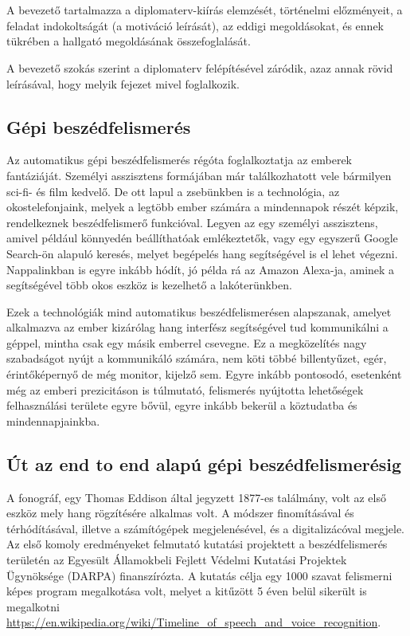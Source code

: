 \chapter{\bevezetes}

A bevezető tartalmazza a diplomaterv-kiírás elemzését, történelmi előzményeit, a feladat indokoltságát (a motiváció leírását), az eddigi megoldásokat, és ennek tükrében a hallgató megoldásának összefoglalását.

A bevezető szokás szerint a diplomaterv felépítésével záródik, azaz annak rövid leírásával, hogy melyik fejezet mivel foglalkozik.

\section{Gépi beszédfelismerés}

Az automatikus gépi beszédfelismerés régóta foglalkoztatja az emberek fantáziáját. Személyi asszisztens formájában már találkozhatott vele bármilyen sci-fi- és film kedvelő. De ott lapul a zsebünkben is a technológia, az okostelefonjaink, melyek a legtöbb ember számára a mindennapok részét képzik, rendelkeznek beszédfelismerő funkcióval. Legyen az egy személyi asszisztens, amivel például könnyedén beállíthatóak emlékeztetők, vagy egy egyszerű Google Search-ön alapuló keresés, melyet begépelés hang segítségével is el lehet végezni. Nappalinkban is egyre inkább hódít, jó példa rá az Amazon Alexa-ja, aminek a segítségével több okos eszköz is kezelhető a lakóterünkben.

Ezek a technológiák mind automatikus beszédfelismerésen alapszanak, amelyet alkalmazva az ember kizárólag hang interfész segítségével tud kommunikálni a géppel, mintha csak egy másik emberrel csevegne. Ez a megközelítés nagy szabadságot nyújt a kommunikáló számára, nem köti többé billentyűzet, egér, érintőképernyő de még monitor, kijelző sem. Egyre inkább pontosodó, esetenként még az emberi prezicitáson is túlmutató, felismerés nyújtotta lehetőségek felhasználási területe egyre bővül, egyre inkább bekerül a köztudatba és mindennapjainkba.

\section{Út az end to end alapú gépi beszédfelismerésig}

A fonográf, egy Thomas Eddison által jegyzett 1877-es találmány, volt az első eszköz mely hang rögzítésére alkalmas volt. A módszer finomításával és térhódításával,  illetve a számítógépek megjelenésével, és a digitalizácóval megjele. Az első komoly eredményeket felmutató kutatási projektett a beszédfelismerés területén az Egyesült Államokbeli Fejlett Védelmi Kutatási Projektek Ügynöksége (DARPA) finanszírózta. A kutatás célja egy 1000 szavat felismerni képes program megalkotása volt, melyet a kitűzött 5 éven belül sikerült is megalkotni \url{https://en.wikipedia.org/wiki/Timeline_of_speech_and_voice_recognition}.

